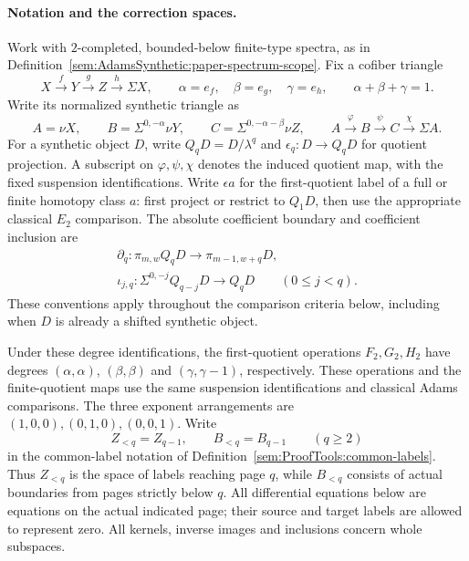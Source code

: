 \paragraph{Notation and the correction spaces.}
Work with $2$-completed, bounded-below finite-type spectra, as in
Definition~\ref{sem:AdamsSynthetic:paper-spectrum-scope}.
Fix a cofiber triangle
\[
X\xrightarrow fY\xrightarrow gZ\xrightarrow h\Sigma X,
\qquad \alpha=e_f,\quad\beta=e_g,\quad\gamma=e_h,
\qquad \alpha+\beta+\gamma=1.
\]
Write its normalized synthetic triangle as
\[
 A=\nu X,\qquad B=\Sigma^{0,-\alpha}\nu Y,\qquad
 C=\Sigma^{0,-\alpha-\beta}\nu Z,\qquad
 A\xrightarrow{\varphi}B\xrightarrow{\psi}C
    \xrightarrow{\chi}\Sigma A.
\]
For a synthetic object $D$, write $Q_qD=D/\lambda^q$ and
$\epsilon_q:D\to Q_qD$ for quotient projection. A subscript on
$\varphi,\psi,\chi$ denotes the induced quotient map, with the fixed
suspension identifications. Write $\epsilon a$ for the first-quotient
label of a full or finite homotopy class $a$: first project or restrict
to $Q_1D$, then use the appropriate classical $E_2$ comparison.
The absolute coefficient boundary and coefficient inclusion are
\[
\begin{gathered}
 \partial_q:\pi_{m,w}Q_qD\longrightarrow\pi_{m-1,w+q}D,\\
 \iota_{j,q}:\Sigma^{0,-j}Q_{q-j}D\longrightarrow Q_qD
 \qquad(0\le j<q).
\end{gathered}
\]
These conventions apply throughout the comparison criteria below,
including when $D$ is already a shifted synthetic object.

Under these degree identifications, the first-quotient operations
$F_2,G_2,H_2$ have degrees
$(\alpha,\alpha)$, $(\beta,\beta)$ and $(\gamma,\gamma-1)$,
respectively. These operations and the finite-quotient maps use the
same suspension identifications and classical Adams comparisons.
The three exponent arrangements are $(1,0,0),(0,1,0),(0,0,1)$.
Write
\[
Z_{<q}=Z_{q-1},\qquad B_{<q}=B_{q-1}\qquad(q\ge2)
\]
in the common-label notation of Definition~\ref{sem:ProofTools:common-labels}.
Thus $Z_{<q}$ is the space of labels reaching page $q$, while
$B_{<q}$ consists of actual boundaries from pages strictly below $q$.
All differential equations below are equations on the actual indicated
page; their source and target labels are allowed to represent zero.
All kernels, inverse images and inclusions concern whole subspaces.


